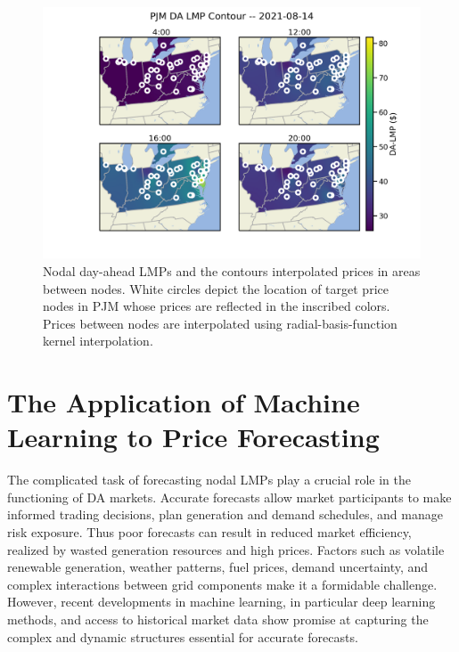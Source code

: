 \begin{figure}[htbp]
    \caption[Contour map of PJM DA LMPs at various times on a single market-day ]{
        Nodal day-ahead LMPs and the contours interpolated prices in areas between nodes.
        White circles depict the location of target price nodes in PJM whose prices are reflected in the
        inscribed colors.
        Prices between nodes are interpolated using radial-basis-function kernel interpolation.
    }
    \begin{center}
        \setlength{\fboxsep}{0pt}%
        \setlength{\fboxrule}{1pt}%
        \includegraphics[width=150mm]{figs/pjm_lmp_contour_singlecbar}
    \end{center}
    \label{fig:contours}
\end{figure}

\section{The Application of Machine Learning to Price Forecasting}\label{sec:the-application-of-machine-learning-to-price-forecasting}

The complicated task of forecasting nodal LMPs play a crucial role in the functioning of DA markets.
Accurate forecasts allow market participants to make informed trading decisions, plan generation and demand schedules,
and manage risk exposure.
Thus poor forecasts can result in reduced market efficiency, realized by wasted generation
resources and high prices.
Factors such as volatile renewable generation, weather patterns, fuel prices, demand uncertainty, and complex
interactions between grid components make it a formidable challenge.
However, recent developments in machine learning, in particular deep learning methods, and access to historical market
data show promise at capturing the complex and dynamic structures essential for accurate forecasts.

